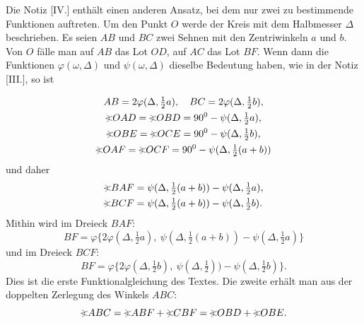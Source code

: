 \indent Die Notiz [IV.] enthält einen anderen Ansatz, bei dem nur zwei zu bestimmende Funktionen auftreten. Um den Punkt \(O\) werde der Kreis mit dem Halbmesser \(\Delta\) beschrieben. Es seien \(AB\) und \(BC\)
\clearpage{}
\noindent zwei Sehnen mit den Zentriwinkeln \(a\) und \(b\). Von \(O\) fälle man auf \(AB\) das Lot \(OD\), auf \(AC\) das Lot \(BF\). Wenn dann die Funktionen \(\varphi(\omega,\Delta)\) und \(\psi(\omega,\Delta)\) dieselbe Bedeutung haben, wie in der Notiz [III.], so ist
\begin{center}
\end{center}
\[
\begin{gathered}
AB=2\varphi(\Delta,\tfrac12 a),\quad BC=2\varphi(\Delta,\tfrac12 b),\\
\GeomAngle OAD=\GeomAngle OBD=90^{0}-\psi(\Delta,\tfrac12 a),\\
\GeomAngle OBE=\GeomAngle OCE=90^{0}-\psi(\Delta,\tfrac12 b),\\
\GeomAngle OAF=\GeomAngle OCF=90^{0}-\psi(\Delta,\tfrac12(a+b))
\end{gathered}
\]
\noindent und daher
\[
\begin{aligned}
\GeomAngle BAF&=\psi(\Delta,\tfrac12(a+b))-\psi(\Delta,\tfrac12 a),\\
\GeomAngle BCF&=\psi(\Delta,\tfrac12(a+b))-\psi(\Delta,\tfrac12 b).
\end{aligned}
\]
\noindent Mithin wird im Dreieck \(BAF\):
\[BF=\varphi\{2\varphi(\Delta,\tfrac12 a),\ \psi(\Delta,\tfrac12(a+b))-\psi(\Delta,\tfrac12 a)\}\]
\noindent und im Dreieck \(BCF\):
\[BF=\varphi\{2\varphi(\Delta,\tfrac12 b),\ \psi(\Delta,\tfrac12))-\psi(\Delta,\tfrac12 b)\}.\]
\noindent Dies ist die erste Funktionalgleichung des Textes. Die zweite erhält man aus der doppelten Zerlegung des Winkels \(ABC\):
\[\GeomAngle ABC=\GeomAngle ABF+\GeomAngle CBF=\GeomAngle OBD+\GeomAngle OBE.\]

